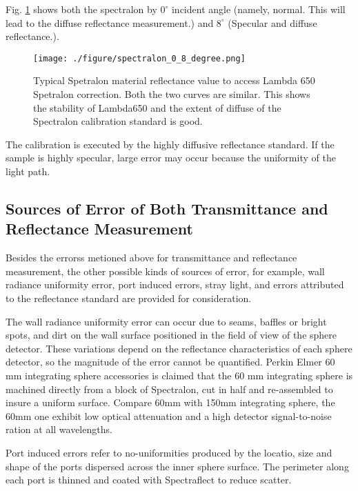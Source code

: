 Fig. \ref{fig:spectralon_0_8_degree.png} shows both the spectralon by $0^\circ$ incident angle (namely, normal. This will lead to the diffuse
reflectance measurement.) and $8^\circ$ (Specular and diffuse reflectance.).


\begin{figure}
    \centering
    \texttt{[image: ./figure/spectralon\_0\_8\_degree.png]}
    \caption[Typical Spetralon material reflectance value to access Lambda 650 Spetralon correction]{Typical Spetralon material reflectance value to access Lambda 650 Spetralon correction. Both the two curves are similar. This shows the stability of Lambda650 and the extent of diffuse of the Spectralon calibration standard is good.}
    \label{fig:spectralon_0_8_degree.png}
    \end{figure}


The calibration is executed by the highly diffusive reflectance standard.
If the sample is highly specular, large error may occur because the uniformity of the light path.


\subsection{Sources of Error of Both Transmittance and Reflectance Measurement}

Besides the errorss metioned above for transmittance and reflectance measurement, the other possible kinds of sources of error, for example,
wall radiance uniformity error, port induced errors, stray light, and errors attributed to the reflectance standard are provided
for consideration.

The wall radiance uniformity error can occur due to seams, baffles or bright spots, and dirt on the wall surface
positioned in the field of view of the sphere detector. These variations depend on the reflectance
characteristics of each sphere detector, so the magnitude of the error cannot be quantified.
Perkin Elmer 60 mm integrating sphere accessories is claimed that the 60 mm integrating sphere is machined
directly from a block of Spectralon, cut in half and
re-assembled to insure a uniform surface. Compare 60mm with 150mm integrating sphere, the 60mm one exhibit low optical
attenuation and a high detector signal-to-noise ration at all wavelengths.

Port induced errors refer to no-uniformities produced by the locatio, size and shape
of the ports dispersed across the inner sphere surface. The perimeter along each
port is thinned and coated with Spectraflect to reduce scatter.

